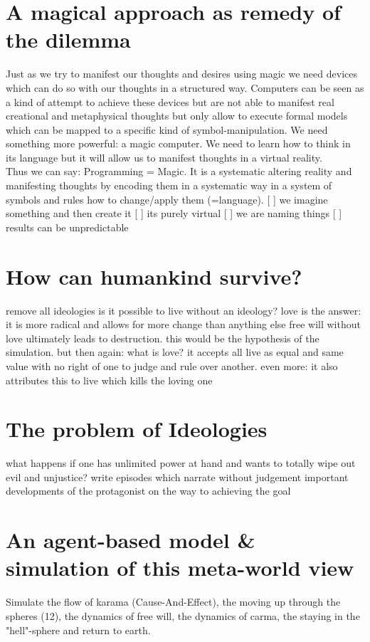 \documentclass{article}
\begin{document}
\section{A magical approach as remedy of the dilemma}
Just as we try to manifest our thoughts and desires using magic we need devices which can do so with our thoughts in a structured way. Computers can be seen as a kind of attempt to achieve these devices but are not able to manifest real creational and metaphysical thoughts but only allow to execute formal models which can be mapped to a specific kind of symbol-manipulation. We need something more powerful: a magic computer. We need to learn how to think in its language but it will allow us to manifest thoughts in a virtual reality. \\
Thus we can say: Programming = Magic. It is a systematic altering reality and manifesting thoughts by encoding them in a systematic way in a system of symbols and rules how to change/apply them (=language).
[ ] we imagine something and then create it
[ ] its purely virtual
[ ] we are naming things
[ ] results can be unpredictable

\section{How can humankind survive?}
remove all ideologies
is it possible to live without an ideology?
love is the answer: it is more radical and allows for more change than anything else
free will without love ultimately leads to destruction. this would be the hypothesis of the simulation. 
but then again: what is love? it accepts all live as equal and same value with no right of one to judge and rule over another. even more: it also attributes this to live which kills the loving one

\section{The problem of Ideologies}
what happens if one has unlimited power at hand and wants to totally wipe out evil and unjustice?
write episodes which narrate without judgement important developments of the protagonist on the way to achieving the goal

\section{An agent-based model \& simulation of this meta-world view}
Simulate the flow of karama (Cause-And-Effect), the moving up through the spheres (12), the dynamics of free will, the dynamics of carma, the staying in the "hell"-sphere and return to earth.




\end{document}
